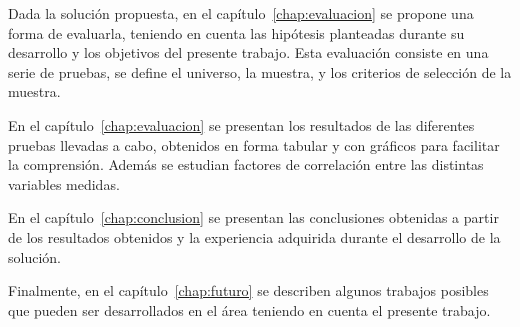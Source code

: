 
Dada la solución propuesta, en el capítulo~\ref{chap:evaluacion} se propone una
forma de evaluarla, teniendo en cuenta las hipótesis planteadas durante su
desarrollo  y los objetivos del presente trabajo. Esta evaluación consiste en
una serie de pruebas, se define el universo, la muestra, y los criterios de
selección de la muestra.


En el capítulo~\ref{chap:evaluacion} se presentan los resultados de las diferentes
pruebas llevadas a cabo, obtenidos en forma tabular y con gráficos para
facilitar la comprensión. Además se estudian factores de correlación entre las
distintas variables medidas.


En el capítulo~\ref{chap:conclusion} se presentan las
conclusiones obtenidas a partir de los resultados obtenidos y la experiencia
adquirida durante el desarrollo de la solución.


Finalmente, en el capítulo~\ref{chap:futuro} se describen algunos trabajos posibles que pueden
ser desarrollados en el área teniendo en cuenta el presente trabajo. 

